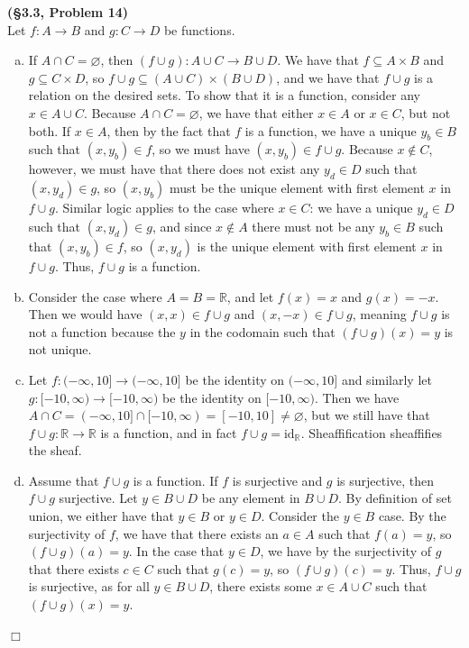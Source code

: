 \documentclass[12pt]{article}
\theoremstyle{definition}
\newenvironment{Solution}{\noindent {\sc Solution.}}{$\Box$ \vspace{2 ex}}
\begin{document}
\begin{Solution}
{\bf (\S3.3, Problem 14)}\\
Let $f : A \to B$ and $g : C \to D$ be functions.
\begin{enumerate}[(a)]
    \item If $A \cap C = \varnothing$, then $(f \cup g) : A \cup C \to B \cup D$. We have that $f \subseteq A \times B$ and $g \subseteq C \times D$, so $f \cup g \subseteq (A \cup C) \times (B \cup D)$, and we have that $f \cup g$ is a relation on the desired sets. To show that it is a function, consider any $x \in A \cup C$. Because $A \cap C = \varnothing$, we have that either $x \in A$ or $x \in C$, but not both. If $x \in A$, then by the fact that $f$ is a function, we have a unique $y_b \in B$ such that $(x,y_b) \in f$, so we must have $(x,y_b) \in f \cup g$. Because $x \not\in C$, however, we must have that there does not exist any $y_d \in D$ such that $(x,y_d) \in g$, so $(x, y_b)$ must be the unique element with first element $x$ in $f \cup g$. Similar logic applies to the case where $x \in C$: we have a unique $y_d \in D$ such that $(x, y_d) \in g$, and since $x \not \in A$ there must not be any $y_b \in B$ such that $(x, y_b) \in f$, so $(x, y_d)$ is the unique element with first element $x$ in $f \cup g$. Thus, $f \cup g$ is a function.
    \item Consider the case where $A =B=\mathbb{R}$, and let $f(x)=x$ and $g(x)=-x$. Then we would have $(x,x) \in f \cup g$ and $(x, -x) \in f \cup g$, meaning $f \cup g$ is not a function because the $y$ in the codomain such that $(f\cup g)(x)=y$ is not unique.
    \item Let $f : (-\infty, 10] \to (-\infty, 10]$ be the identity on $(-\infty, 10]$ and similarly let $g : [-10, \infty) \to [-10,\infty)$ be the identity on $[-10,\infty)$. Then we have $A\cap C = (-\infty, 10] \cap [-10,\infty) = [-10,10] \ne \varnothing$, but we still have that $f \cup g : \mathbb R \to \mathbb R$ is a function, and in fact $f \cup g = \mathrm{id}_\mathbb{R}$. Sheaffification sheaffifies the sheaf.
    \item Assume that $f \cup g$ is a function. If $f$ is surjective and $g$ is surjective, then $f \cup g$ surjective. Let $y \in B \cup D$ be any element in $B \cup D$. By definition of set union, we either have that $y \in B$ or $y \in D$. Consider the $y \in B$ case. By the surjectivity of $f$, we have that there exists an $a \in A$ such that $f(a) = y$, so $(f\cup g)(a) = y$. In the case that $y \in D$, we have by the surjectivity of $g$ that there exists $c \in C$ such that $g(c) = y$, so $(f\cup g)(c) = y$. Thus, $f\cup g$ is surjective, as for all $y \in B \cup D$, there exists some $x \in A \cup C$ such that $(f\cup g)(x) = y$.

\end{enumerate}
\end{Solution}
\end{document}
